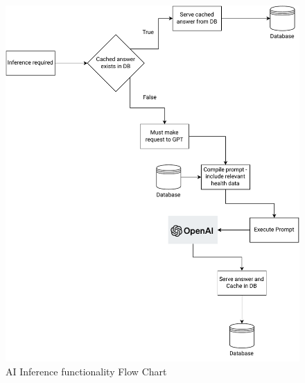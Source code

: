 \begin{figure}
    
    \centering
    \includegraphics[width=\textwidth,height=\textheight,keepaspectratio]{../images/ai.pdf}
    \caption{AI Inference functionality Flow Chart}
    \label{fig:5}
    
\end{figure}


